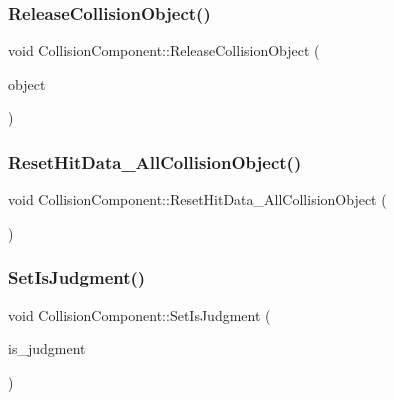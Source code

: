 \subsubsection{\texorpdfstring{Release\+Collision\+Object()}{ReleaseCollisionObject()}}
{\footnotesize\ttfamily void Collision\+Component\+::\+Release\+Collision\+Object (\begin{DoxyParamCaption}\item[{\mbox{\hyperlink{class_collision_object}{Collision\+Object}} $\ast$}]{object }\end{DoxyParamCaption})\hspace{0.3cm}{\ttfamily [inline]}}

\mbox{\label{class_collision_component_a15b0f056baad5d48d14cc7a611ca768d}} 
\subsubsection{\texorpdfstring{Reset\+Hit\+Data\+\_\+\+All\+Collision\+Object()}{ResetHitData\_AllCollisionObject()}}
{\footnotesize\ttfamily void Collision\+Component\+::\+Reset\+Hit\+Data\+\_\+\+All\+Collision\+Object (\begin{DoxyParamCaption}{ }\end{DoxyParamCaption})\hspace{0.3cm}{\ttfamily [inline]}}

\mbox{\label{class_collision_component_acbda86e666f83d89bfb4c393ebfff0d0}} 
\subsubsection{\texorpdfstring{Set\+Is\+Judgment()}{SetIsJudgment()}}
{\footnotesize\ttfamily void Collision\+Component\+::\+Set\+Is\+Judgment (\begin{DoxyParamCaption}\item[{bool}]{is\+\_\+judgment }\end{DoxyParamCaption})\hspace{0.3cm}{\ttfamily [inline]}}

